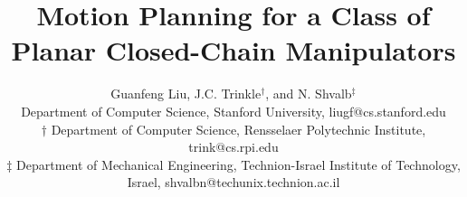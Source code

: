 \documentclass[twocolumn]{IEEEtran}
\begin{document}
\title{Motion Planning for a Class of Planar Closed-Chain
Manipulators
}

\author{Guanfeng Liu, J.C. Trinkle$^\dagger$, and N. Shvalb$^\ddagger$\\
Department of Computer Science, Stanford University, liugf@cs.stanford.edu\\
 $\dagger$  Department of Computer Science, Rensselaer Polytechnic Institute, trink@cs.rpi.edu\\
$\ddagger$ Department of Mechanical Engineering, Technion-Israel Institute of Technology, Israel,
shvalbn@techunix.technion.ac.il}



%
\end{document}
